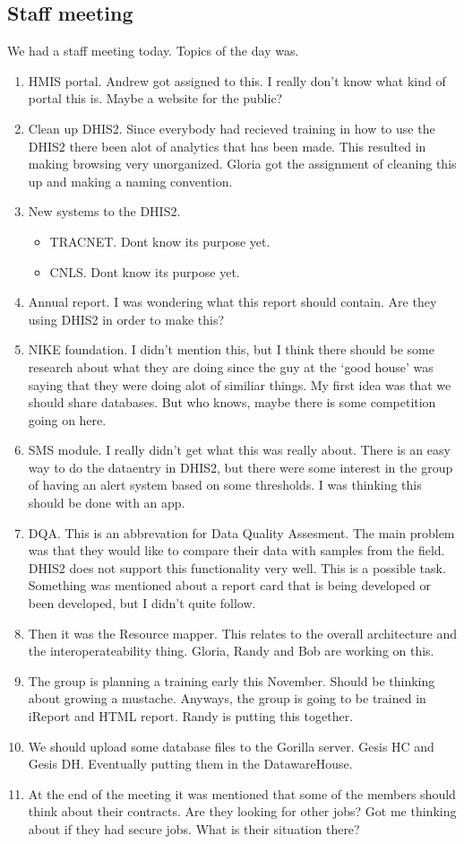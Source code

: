 \subsection{Staff meeting}
We had a staff meeting today. Topics of the day was.
\begin{enumerate}
\item HMIS portal. Andrew got assigned to this. I really don't know what kind of portal this is. Maybe a website for the public?
\item Clean up DHIS2. Since everybody had recieved training in how to use the DHIS2 there been alot of analytics that has been made. This resulted in making browsing very unorganized. Gloria got the assignment of cleaning this up and making a naming convention.
\item New systems to the DHIS2.
	\begin{itemize}
	\item TRACNET. Dont know its purpose yet.
	\item CNLS. Dont know its purpose yet.
	\end{itemize}
\item Annual report. I was wondering what this report should contain. Are they using DHIS2 in order to make this?
\item NIKE foundation. I didn't mention this, but I think there should be some research about what they are doing since the guy at the `good house' was saying that they were doing alot of similiar things. My first idea was that we should share databases. But who knows, maybe there is some competition going on here.
\item SMS module. I really didn't get what this was really about. There is an easy way to do the dataentry in DHIS2, but there were some interest in the group of having an alert system based on some thresholds. I was thinking this should be done with an app.
\item DQA. This is an abbrevation for Data Quality Assesment. The main problem was that they would like to compare their data with samples from the field. DHIS2 does not support this functionality very well. This is a possible task. Something was mentioned about a report card that is being developed or been developed, but I didn't quite follow.
\item Then it was the Resource mapper. This relates to the overall architecture and the interoperateability thing. Gloria, Randy and Bob are working on this. 
\item The group is planning a training early this November. Should be thinking about growing a mustache. Anyways, the group is going to be trained in iReport and HTML report. Randy is putting this together.
\item We should upload some database files to the Gorilla server. Gesis HC and Gesis DH. Eventually putting them in the DatawareHouse.
\item At the end of the meeting it was mentioned that some of the members should think about their contracts. Are they looking for other jobs? Got me thinking about if they had secure jobs. What is their situation there?
\end{enumerate}
